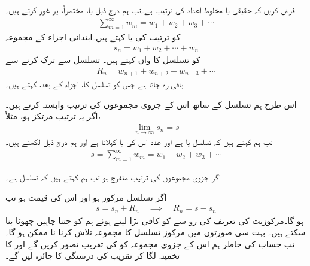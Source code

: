 فرض کریں کہ  حقیقی یا مخلوط اعداد کی ترتیب ہے۔تب ہم درج ذیل  یا، مختصراً،  پر غور کرتے ہیں۔
\begin{align}\label{مساوات_ترتیب_تسلسل_الف}
\sum_{m=1}^{\infty} w_m=w_1+w_2+w_3+\cdots
\end{align}
 کو ترتیب کی  یا   کہتے ہیں۔ابتدائی  اجزاء کے مجموعہ
\begin{align}\label{مساوات_ترتیب_تسلسل_ب}
s_n=w_1+w_2+\cdots+w_n
\end{align}
کو تسلسل  کا  واں  کہتے ہیں۔ تسلسل  سے   ترک کرنے سے
\begin{align}
R_n=w_{n+1}+w_{n+2}+w_{n+3}+\cdots
\end{align}
باقی رہ جاتا ہے جس کو تسلسل  کا،  اجزاء کے بعد،  کہتے ہیں۔ 

اس طرح ہم تسلسل  کے ساتھ اس کے جزوی مجموعوں  کی ترتیب وابستہ کرتے ہیں۔اگر یہ ترتیب مرتکز ہو، مثلاً،
\begin{align*}
\lim_{n\to \infty} s_n=s
\end{align*}
تب ہم کہتے ہیں کہ تسلسل   یا  ہے اور عدد  اس کی  یا  کہلاتا ہے اور ہم درج ذیل لکھتے ہیں۔
\begin{align*}
s=\sum_{m=1}^{\infty} w_m=w_1+w_2+w_3+\cdots
\end{align*}

اگر جزوی مجموعوں کی ترتیب منفرج ہو تب ہم کہتے ہیں کہ تسلسل     ہے۔

اگر تسلسل  مرکوز ہو اور اس کی قیمت  ہو تب
\begin{align}
s=s_n+R_n\quad \implies \quad R_n=s-s_n
\end{align}
ہو گا۔مرکوزیت کی تعریف کی رو سے  کو کافی بڑا لیتے ہوئے  ہم  کو جتنا چاہیں چھوٹا بنا سکتے ہیں۔ بہت سی صورتوں میں مرکوز تسلسل کا مجموعہ  تلاش کرنا نا ممکن ہو گا۔تب حساب کی خاطر ہم اس کے جزوی مجموعہ  کو  کی تقریب تصور کریں گے اور  کا تخمینہ لگا کر  تقریب کی درستگی کا جائزہ لیں گے۔

